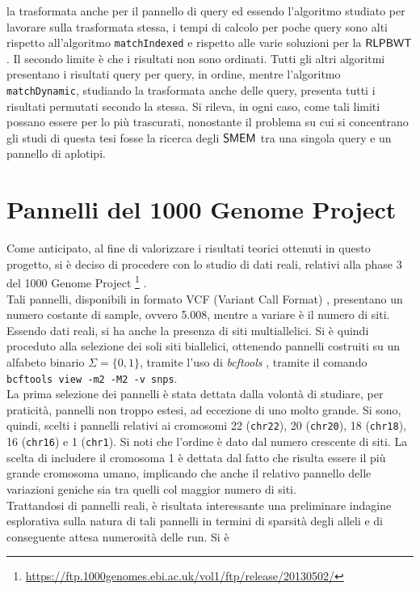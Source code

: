 la trasformata anche per il pannello di query ed essendo l'algoritmo studiato
per lavorare sulla trasformata stessa, i tempi di calcolo per poche query sono
alti rispetto all'algoritmo \texttt{matchIndexed} e rispetto alle varie
soluzioni per la $\mbox{\rm {\sf RLPBWT}}$. Il secondo limite è che i risultati non sono
ordinati. Tutti gli altri algoritmi presentano i risultati query per query, in
ordine, mentre l'algoritmo \texttt{matchDynamic}, studiando la trasformata anche
delle query,
presenta tutti i risultati permutati secondo la stessa. Si rileva, in ogni caso,
come tali limiti possano essere per lo più trascurati, nonostante il problema su
cui si concentrano gli studi di questa tesi fosse la ricerca degli $\mbox{\rm {\sf SMEM}}$ tra
una 
singola query e un pannello di aplotipi.
\section{Pannelli del 1000 Genome Project}
Come anticipato, al fine di valorizzare i risultati teorici ottenuti in
questo progetto, si 
è deciso di procedere con lo studio di dati reali, relativi alla phase
  3 del 1000 Genome Project
\footnote{\url{https://ftp.1000genomes.ebi.ac.uk/vol1/ftp/release/20130502/}}
\cite{1kgp}.\\ 
Tali pannelli, disponibili in formato VCF (Variant Call Format) \cite{vcf},
presentano un numero 
costante di sample, ovvero 5.008, mentre a variare è il numero di siti. Essendo
dati reali, si ha anche la presenza di siti multiallelici. Si è quindi proceduto
alla selezione dei soli siti biallelici, ottenendo pannelli costruiti su
un alfabeto binario $\Sigma=\{0,1\}$, tramite l'uso di \textit{bcftools}
\cite{bcftools}, tramite il comando \texttt{bcftools view -m2 -M2
  -v snps}.\\
La prima selezione dei pannelli è stata dettata dalla volontà di studiare, per
praticità, pannelli non troppo estesi, ad eccezione di uno molto grande. Si
sono, 
quindi, scelti i pannelli relativi ai cromosomi 22 (\texttt{chr22}), 20
(\texttt{chr20}), 18 (\texttt{chr18}), 16 (\texttt{chr16}) e 1 (\texttt{chr1}).
Si noti che  
l'ordine è dato dal numero crescente di siti. La scelta di includere il
cromosoma 1 è dettata dal fatto che risulta essere il più grande cromosoma
umano, implicando che anche il relativo pannello delle variazioni geniche
sia tra quelli col maggior numero di siti.\\
Trattandosi di pannelli reali, è risultata interessante una preliminare
indagine esplorativa sulla natura di tali pannelli in termini di
sparsità degli alleli e di conseguente attesa numerosità delle run. Si è
